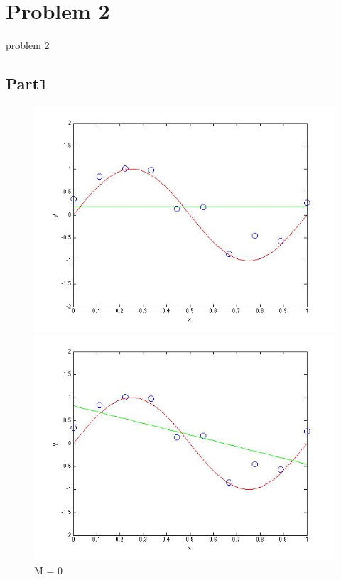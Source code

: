 \section{Problem 2}

problem 2

\subsection{Part1}


\begin{figure}[!htb]
  \includegraphics[width=\linewidth]{figures/p2_MLE_M=0}
  \caption{M = 0}\label{fig:figures/p2_MLE_M=0}
\endminipage\hfill
{}
  \includegraphics[width=\linewidth]{figures/p2_MLE_M=1}

\end{figure}
